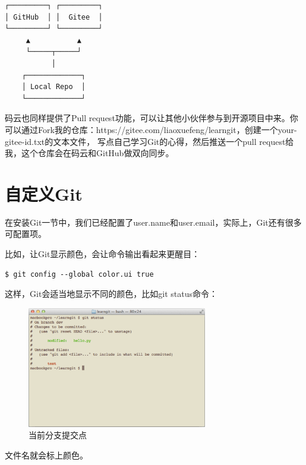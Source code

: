 \begin{verbatim}
┌─────────┐ ┌─────────┐
│ GitHub  │ │  Gitee  │
└─────────┘ └─────────┘
     ▲           ▲
     └─────┬─────┘
           │
    ┌─────────────┐
    │ Local Repo  │
    └─────────────┘
\end{verbatim}

码云也同样提供了Pull request功能，可以让其他小伙伴参与到开源项目中来。你可以通过Fork我的仓库：https://gitee.com/liaoxuefeng/learngit，创建一个your-gitee-id.txt的文本文件， 写点自己学习Git的心得，然后推送一个pull request给我，这个仓库会在码云和GitHub做双向同步。

\chapter{自定义Git}

在安装Git一节中，我们已经配置了user.name和user.email，实际上，Git还有很多可配置项。

比如，让Git显示颜色，会让命令输出看起来更醒目：

\begin{verbatim}
$ git config --global color.ui true
\end{verbatim}

这样，Git会适当地显示不同的颜色，比如git status命令：


\begin{figure}[h]
  \centering
  \includegraphics[width=0.7\textwidth]{img/git-color.png}
  \caption{当前分支提交点}
  \label{fig:git-color}
\end{figure}

文件名就会标上颜色。

